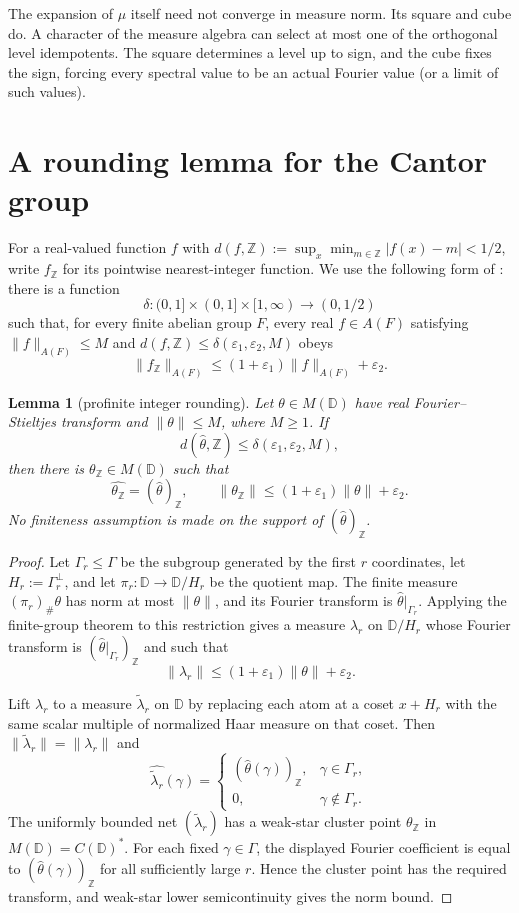 \documentclass[11pt]{article}
\newtheorem{lemma}[theorem]{Lemma}
\newcommand{\D}{\mathbb D}
\newcommand{\M}{M}
\newcommand{\Z}{\mathbb Z}
\newcommand{\wh}{\widehat}
\begin{document}
The expansion of $\mu$ itself need not converge in measure norm.  Its square
and cube do.  A character of the measure algebra can select at most one of the
orthogonal level idempotents.  The square determines a level up to sign, and
the cube fixes the sign, forcing every spectral value to be an actual Fourier
value (or a limit of such values).

\section{A rounding lemma for the Cantor group}

For a real-valued function $f$ with
$d(f,\Z):=\sup_x\min_{m\in\Z}|f(x)-m|<1/2$, write $f_{\Z}$ for its
pointwise nearest-integer function.  We use the following form of
\cite[Theorem 11]{OSW}: there is a function
\[
 \delta:(0,1]\times(0,1]\times[1,\infty)\longrightarrow(0,1/2)
\]
such that, for every finite abelian group $F$, every real
$f\in A(F)$ satisfying $\|f\|_{A(F)}\leq M$ and
$d(f,\Z)\leq\delta(\varepsilon_1,\varepsilon_2,M)$ obeys
\[
 \|f_{\Z}\|_{A(F)}
 \leq(1+\varepsilon_1)\|f\|_{A(F)}+\varepsilon_2.
\]

\begin{lemma}[profinite integer rounding]\label{lem:round}
Let $\theta\in\M(\D)$ have real Fourier--Stieltjes transform and
$\|\theta\|\leq M$, where $M\geq1$.  If
\[
 d(\wh\theta,\Z)\leq
 \delta(\varepsilon_1,\varepsilon_2,M),
\]
then there is $\theta_{\Z}\in\M(\D)$ such that
\[
 \wh{\theta_{\Z}}=(\wh\theta)_{\Z},
 \qquad
 \|\theta_{\Z}\|
 \leq(1+\varepsilon_1)\|\theta\|+\varepsilon_2.
\]
No finiteness assumption is made on the support of
$(\wh\theta)_{\Z}$.
\end{lemma}

\begin{proof}
Let $\Gamma_r\leq\Gamma$ be the subgroup generated by the first $r$
coordinates, let $H_r:=\Gamma_r^\perp$, and let
$\pi_r:\D\to\D/H_r$ be the quotient map.  The finite measure
$(\pi_r)_\#\theta$ has norm at most $\|\theta\|$, and its Fourier
transform is $\wh\theta|_{\Gamma_r}$.  Applying the finite-group theorem
to this restriction gives a measure $\lambda_r$ on $\D/H_r$ whose Fourier
transform is $(\wh\theta|_{\Gamma_r})_{\Z}$ and such that
\[
 \|\lambda_r\|
 \leq(1+\varepsilon_1)\|\theta\|+\varepsilon_2.
\]

Lift $\lambda_r$ to a measure $\widetilde\lambda_r$ on $\D$ by replacing
each atom at a coset $x+H_r$ with the same scalar multiple of normalized Haar
measure on that coset.  Then $\|\widetilde\lambda_r\|=\|\lambda_r\|$ and
\[
 \wh{\widetilde\lambda_r}(\gamma)=
 \begin{cases}
   (\wh\theta(\gamma))_{\Z},&\gamma\in\Gamma_r,\\
   0,&\gamma\notin\Gamma_r.
 \end{cases}
\]
The uniformly bounded net $(\widetilde\lambda_r)$ has a weak-star cluster
point $\theta_{\Z}$ in $\M(\D)=C(\D)^*$.  For each fixed
$\gamma\in\Gamma$, the displayed Fourier coefficient is equal to
$(\wh\theta(\gamma))_{\Z}$ for all sufficiently large $r$.  Hence the
cluster point has the required transform, and weak-star lower
semicontinuity gives the norm bound.
\end{proof}
\end{document}
